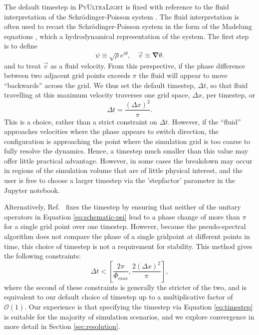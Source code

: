 \documentclass[a4paper,11pt]{article}
\newcommand{\PyUltraLight}{\textsc{PyUltraLight}\xspace}
\begin{document}
The default timestep in  \PyUltraLight  is fixed with reference to the fluid interpretation of the Schr{\"o}dinger-Poisson system \cite{Hui:2016ltb}. The fluid interpretation is often used to recast the Schr{\"o}dinger-Poisson system in the form of the Madelung equations \cite{Suarez:2011yf}, which a hydrodynamical representation of the system. The first step is to define
\begin{equation}\label{eq:madelung}
    \psi\equiv\sqrt{\rho}e^{i\theta}, \quad \vec{v}\equiv\boldsymbol{\nabla}\theta.
\end{equation}
and to treat $\vec{v}$ as a fluid velocity.  From this perspective, if the phase difference between two adjacent grid points exceeds $\pi$ the fluid will appear to move ``backwards'' across the grid. We thus set the default timestep, $\Delta t$, so that fluid travelling at this maximum velocity traverses one grid space, $\Delta x$, per timestep, or
\begin{equation}\label{eq:timestep}
    \Delta t = \frac{(\Delta x)^2}{\pi}.
\end{equation}
This is a choice, rather than a strict constraint on $\Delta t$. However, if the ``fluid'' approaches velocities where the phase appears to switch direction, the configuration is approaching the point where the simulation grid is too coarse to fully resolve the dynamics. Hence, a timestep much smaller than this value may offer little practical advantage. However, in some cases the breakdown may occur in regions of the simulation volume that are of little physical interest, and the user is free to choose a larger timestep via the 'step\textunderscore factor' parameter in the Jupyter notebook.

Alternatively, Ref.~\cite{Mocz:2017wlg} fixes the timestep by ensuring that neither of the unitary operators in Equation \ref{eq:schematic-psi}  lead to a phase change of more than $\pi$ for a single grid point over one timestep. However, because the pseudo-spectral algorithm does not compare the phase of a single gridpoint at different points in time, this choice of timestep is not a requirement for stability. This method gives the following constraints: 
\begin{equation}
    \Delta t < \left[\frac{2\pi}{\Phi_{max}}, \frac{2(\Delta x)^2}{\pi}\right],
\end{equation}
%
where the second of these constraints is generally the stricter of the two, and is equivalent to our default choice of timestep up to a multiplicative factor of $\mathcal{O}(1)$. Our experience is that specifying the timestep via Equation \ref{eq:timestep} is suitable for the majority of simulation scenarios, and we explore convergence in more detail in Section \ref{sec:resolution}.
\end{document}
